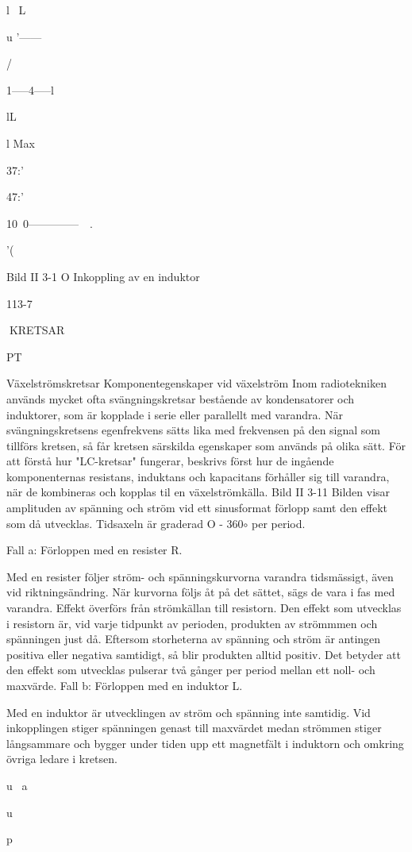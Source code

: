 \documentclass[a4paper,twoside,twocolumn,openright]{book}
\begin{document}
{{{{l~
L

u
'------{ /

1-----4-----l

lL

l Max

37:'

47:'

10~0--------------~~.

'(

Bild II 3-1 O Inkoppling av en induktor

113-7

KRETSAR

PT

Växelströmskretsar
Komponentegenskaper vid växelström
Inom radiotekniken används mycket ofta
svängningskretsar bestående av kondensatorer och induktorer, som är kopplade i serie
eller parallellt med varandra. När svängningskretsens egenfrekvens sätts lika med
frekvensen på den signal som tillförs kretsen, så får kretsen särskilda egenskaper
som används på olika sätt.
För att förstå hur "LC-kretsar" fungerar,
beskrivs först hur de ingående komponenternas resistans, induktans och kapacitans
förhåller sig till varandra, när de kombineras
och kopplas til en växelströmkälla.
Bild II 3-11
Bilden visar amplituden av spänning och
ström vid ett sinusformat förlopp samt den
effekt som då utvecklas. Tidsaxeln är graderad O - 360$\circ$ per period.

Fall a: Förloppen med en resister R.

Med en resister följer ström- och spänningskurvorna varandra tidsmässigt, även
vid riktningsändring. När kurvorna följs åt på
det sättet, sägs de vara i fas med varandra.
Effekt överförs från strömkällan till resistorn. Den effekt som utvecklas i resistorn är,
vid varje tidpunkt av perioden, produkten av
strömmmen och spänningen just då. Eftersom storheterna av spänning och ström är
antingen positiva eller negativa samtidigt, så
blir produkten alltid positiv. Det betyder att
den effekt som utvecklas pulserar två gånger per period mellan ett noll- och maxvärde.
Fall b: Förloppen med en induktor L.

Med en induktor är utvecklingen av ström
och spänning inte samtidig. Vid inkopplingen stiger spänningen genast till maxvärdet
medan strömmen stiger långsammare och
bygger under tiden upp ett magnetfält i induktorn och omkring övriga ledare i kretsen.

u~
a

u~

p

}}}}}
\end{document}
